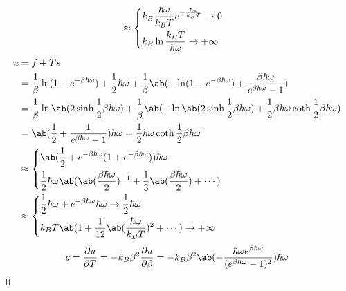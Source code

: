 \documentclass[uplatex,diffipdfmx,a4paper,11pt]{jlreq}
\makeatletter
\numberwithin{equation}{section}
\theoremstyle{definition}
\renewenvironment{proof}[1][\proofname]{\par
  \normalfont
  \topsep6\p@\@plus6\p@ \trivlist
  \item[\hskip\labelsep{\bfseries #1}\@addpunct{\bfseries}]\ignorespaces\quad\par
}{%
  \qed\endtrivlist\@endpefalse
}
\renewcommand\proofname{証明}
\makeatother
\begin{document}
\begin{proof}
\begin{align}
      & \approx \begin{dcases}
                  k_B\frac{\hbar\omega}{k_BT}e^{- \frac{\hbar\omega}{k_BT}} \to 0 \\
                  k_B\ln\frac{k_BT}{\hbar\omega} \to +\infty                      \\
                \end{dcases}
  \end{align}
  \begin{align}
    u & = f + Ts                                                                                                                                                                                   \\
      & = \frac{1}{\beta}\ln(1 - e^{-\beta\hbar\omega}) + \frac{1}{2}\hbar\omega + \frac{1}{\beta}\ab(-\ln(1 - e^{-\beta\hbar\omega}) + \frac{\beta\hbar\omega}{e^{\beta\hbar\omega} - 1})         \\
      & = \frac{1}{\beta}\ln\ab(2\sinh \frac{1}{2}\beta\hbar\omega) + \frac{1}{\beta}\ab(-\ln\ab(2\sinh\frac{1}{2}\beta\hbar\omega) + \frac{1}{2}\beta\hbar\omega\coth\frac{1}{2}\beta\hbar\omega) \\
      & = \ab(\frac{1}{2} + \frac{1}{e^{\beta\hbar\omega} - 1})\hbar\omega = \frac{1}{2}\hbar\omega\coth\frac{1}{2}\beta\hbar\omega                                                                \\
      & \approx \begin{dcases}
                  \ab(\frac{1}{2} + e^{-\beta\hbar\omega}(1 + e^{-\beta\hbar\omega}))\hbar\omega                                        \\
                  \frac{1}{2}\hbar\omega\ab(\ab(\frac{\beta\hbar\omega}{2})^{-1} + \frac{1}{3}\ab(\frac{\beta\hbar\omega}{2}) + \cdots) \\
                \end{dcases}                                                              \\
      & \approx \begin{dcases}
                  \frac{1}{2}\hbar\omega + e^{-\beta\hbar\omega}\hbar\omega \to \frac{1}{2}\hbar\omega \\
                  k_BT\ab(1 + \frac{1}{12}\ab(\frac{\hbar\omega}{k_BT})^{2} + \cdots) \to +\infty      \\
                \end{dcases}
  \end{align}
  \begin{align}
    c & = \diffp{u}{T} = -k_B\beta^2\diffp{u}{\beta} = -k_B\beta^2\ab(-\frac{\hbar\omega e^{\beta\hbar\omega}}{(e^{\beta\hbar\omega} - 1)^2})\hbar\omega                              \\

\end{align}
\end{proof}
\end{document}
